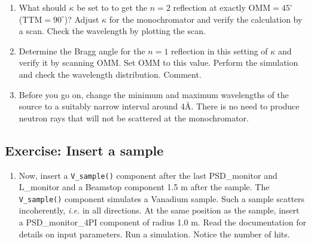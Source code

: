 \begin{enumerate}
\item{What should $\kappa$ be set to to get the $n=2$ reflection at exactly OMM$=45^\circ$ (TTM$=90^\circ$)? Adjust $\kappa$ for the monochromator and verify the calculation by a scan. Check the wavelength by plotting the scan.}
\item{Determine the Bragg angle for the $n=1$ reflection in this setting of $\kappa$ and verify it by scanning OMM. Set OMM to this value. Perform the simulation and check the wavelength distribution. Comment.}
\item{Before you go on, change the minimum and maximum wavelengths of the source to a suitably narrow interval around 4\AA. There is no need to produce neutron rays that will not be scattered at the monochromator.}
\end{enumerate}
\subsection{Exercise: Insert a sample}
\begin{enumerate}
\item{Now, insert a \verb+V_sample()+ component after the last PSD\_monitor and L\_monitor and a Beamstop component 1.5 m after the sample. The \verb+V_sample()+ component simulates a Vanadium sample. Such a sample scatters incoherently, \emph{i.e.} in all directions. At the same position as the sample, insert a PSD\_monitor\_4PI component of radius 1.0 m. Read the documentation for details on input parameters. Run a simulation. Notice the number of hits.}
\end{enumerate}
